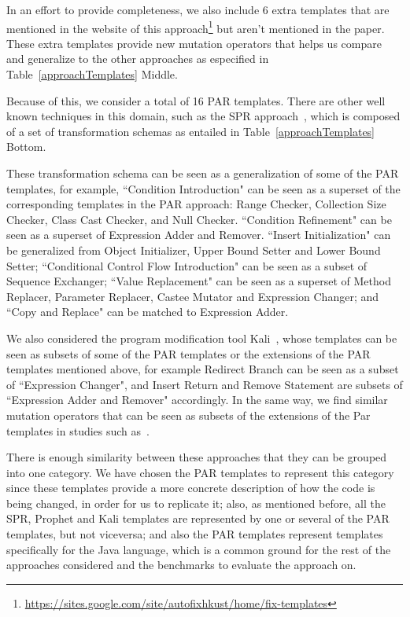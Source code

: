 \documentclass[conference]{IEEEtran}
\begin{document}
In an effort to provide completeness, we also include 6 extra templates that are 
mentioned in the website of this 
approach\footnote{\url{https://sites.google.com/site/autofixhkust/home/fix-templates}} 
but aren't mentioned in the paper\cite{kim2013}. These extra templates provide new mutation operators that helps us compare and generalize to the other approaches as especified in Table~\ref{approachTemplates} Middle.

Because of this, we consider a total of 16 PAR templates. There are other well known techniques in this domain, such as the SPR 
approach~\cite{fan15}, which is composed of a set of transformation schemas as entailed in Table~\ref{approachTemplates} Bottom.

These transformation schema can be seen as a generalization of some of the PAR 
templates, for example, ``Condition Introduction" can be seen as a superset of 
the corresponding templates in the PAR approach: Range Checker, Collection Size 
Checker, Class Cast Checker, and Null Checker. ``Condition Refinement" can be 
seen as a superset of 
Expression Adder and Remover. ``Insert Initialization" can be 
generalized from Object Initializer, Upper Bound Setter and Lower Bound Setter; ``Conditional Control Flow Introduction" can be 
seen as a subset of Sequence Exchanger;
``Value Replacement" can be seen as a superset of Method 
Replacer, Parameter Replacer, Castee Mutator and Expression Changer; and ``Copy 
and Replace" can be matched to Expression Adder. 

We also considered the program modification tool Kali~\cite{Qi15}, whose
templates can be seen as subsets of some of the PAR templates or the extensions
of the PAR templates mentioned above, for example Redirect Branch can be seen as
a subset of ``Expression Changer", and Insert Return and Remove Statement are
subsets of ``Expression Adder and Remover" accordingly. In the same way, we find
similar mutation operators that can be seen as subsets of the extensions of the
Par templates in studies such as~\cite{Offutt96,Offutt06}. 

There is enough similarity between these approaches that they can be grouped 
into one category. We have chosen the PAR templates to represent this category 
since these templates provide a more concrete description of how the code is 
being changed, in order for us to replicate it; also, as mentioned before, all the SPR, Prophet and Kali templates are represented by one or several of the PAR templates, but not viceversa; and also the PAR templates represent templates specifically for the Java language, which is a common ground for the rest of the 
approaches considered and the benchmarks to evaluate the approach on.
\end{document}
